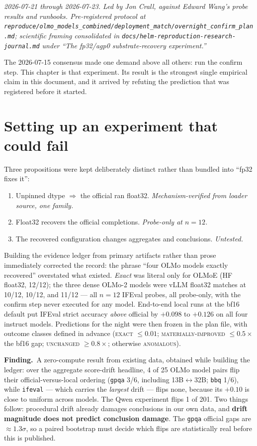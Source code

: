 \documentclass[11pt]{report}
\newcommand{\code}[1]{\texttt{#1}}
\newcommand{\file}[1]{\texttt{#1}}
\newcommand{\finding}[1]{\par\noindent\textbf{Finding.}~#1\par}
\begin{document}
\emph{2026-07-21 through 2026-07-23. Led by Jon Crall, against Edward Wang's probe
results and runbooks. Pre-registered protocol at
\file{reproduce/olmo\_models\_combined/deployment\_match/overnight\_confirm\_plan.md};
scientific framing consolidated in
\file{docs/helm-reproduction-research-journal.md} under ``The fp32/agp0
substrate-recovery experiment.''}

The 2026-07-15 consensus made one demand above all others: run the confirm step.
This chapter is that experiment. Its result is the strongest single empirical claim
in this document, and it arrived by refuting the prediction that was registered
before it started.

\section{Setting up an experiment that could fail}

Three propositions were kept deliberately distinct rather than bundled into ``fp32
fixes it'':

\begin{enumerate}[nosep]
  \item[\textbf{A}] Unpinned dtype $\Rightarrow$ the official ran float32.
        \emph{Mechanism-verified from loader source, one family.}
  \item[\textbf{B}] Float32 recovers the official completions. \emph{Probe-only at
        $n=12$.}
  \item[\textbf{C}] The recovered configuration changes aggregates and conclusions.
        \emph{Untested.}
\end{enumerate}

Building the evidence ledger from primary artifacts rather than prose immediately
corrected the record: the phrase ``four OLMo models exactly recovered'' overstated
what existed. \emph{Exact} was literal only for OLMoE (HF float32, 12/12); the three
dense OLMo-2 models were vLLM float32 matches at 10/12, 10/12, and 11/12 --- all
$n=12$ IFEval probes, all probe-only, with the confirm step never executed for any
model. End-to-end local runs at the bf16 default put IFEval strict accuracy
\emph{above} official by $+0.098$ to $+0.126$ on all four instruct models.
Predictions for the night were then frozen in the plan file, with outcome classes
defined in advance (\textsc{exact} $\leq0.01$; \textsc{materially-improved}
$\leq0.5\times$ the bf16 gap; \textsc{unchanged} $\geq0.8\times$; otherwise
\textsc{anomalous}).

\finding{A zero-compute result from existing data, obtained while building the
ledger: over the aggregate score-drift headline, 4 of 25 OLMo model pairs flip their
official-versus-local ordering (\code{gpqa} 3/6, including 13B$\leftrightarrow$32B;
\code{bbq} 1/6), while \code{ifeval} --- which carries the \emph{largest} drift ---
flips none, because its $+0.10$ is close to uniform across models. The Qwen
experiment flips 1 of 201. Two things follow: procedural drift already damages
conclusions in our own data, and \textbf{drift magnitude does not predict conclusion
damage}. The \code{gpqa} official gaps are $\approx1.3\sigma$, so a paired bootstrap
must decide which flips are statistically real before this is published.}
\end{document}
